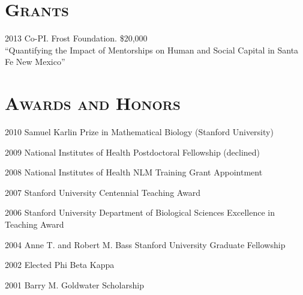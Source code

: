 \documentclass[centered,overlapped,line]{res}
\begin{document}
\begin{resume}


\newpage

  \section{\bf \large \scshape Grants}
  \begin{compactitem}
  \item[2013] Co-PI. Frost Foundation. \$20,000 \\
    ``Quantifying the Impact of Mentorships on Human and Social Capital in Santa Fe New Mexico''
  \end{compactitem}
  
  \section{\bf \large \scshape  Awards and Honors}

  \begin{compactitem}
  \item[2010] Samuel Karlin Prize in Mathematical Biology (Stanford University) 
  \item[2009] National Institutes of Health Postdoctoral Fellowship (declined)
  \item[2008] National Institutes of Health NLM Training Grant Appointment
  \item[2007] Stanford University Centennial Teaching Award
  \item[2006] Stanford University Department of Biological Sciences Excellence in Teaching Award
  \item[2004] Anne T. and Robert M. Bass Stanford University Graduate Fellowship
  \item[2002] Elected Phi Beta Kappa
  \item[2001] Barry M. Goldwater Scholarship
  \end{compactitem}


\end{resume}
\end{document}
